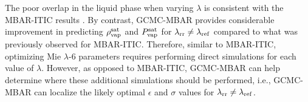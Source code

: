 \documentclass[journal=jced,manuscript=article]{achemso}
\begin{document}
The poor overlap in the liquid phase when varying $\lambda$ is consistent with the MBAR-ITIC results \cite{Postdoc_1}. By contrast, GCMC-MBAR provides considerable improvement in predicting $\rho_{\rm vap}^{\rm sat}$ and $P_{\rm vap}^{\rm sat}$ for $\lambda_{\rm rr} \neq \lambda_{\rm ref}$ compared to what was previously observed for MBAR-ITIC. Therefore, similar to MBAR-ITIC, optimizing Mie $\lambda$-6 parameters requires performing direct simulations for each value of $\lambda$. However, as opposed to MBAR-ITIC, GCMC-MBAR can help determine where these additional simulations should be performed, i.e., GCMC-MBAR can localize the likely optimal $\epsilon$ and $\sigma$ values for $\lambda_{\rm rr} \neq \lambda_{\rm ref}$.

\end{document}
